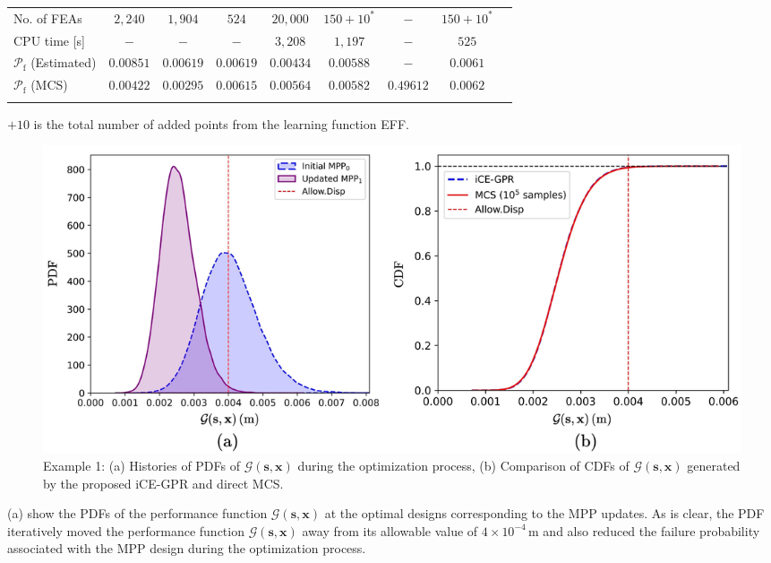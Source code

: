\documentclass[preprint,3p]{elsarticle}
\begin{document}
\begin{linenumbers}
\begin{table}
\begin{center}
{\begin{threeparttable}
\begin{tabular}{lcccccccc}
                    No. of FEAs & $2,240$&   $1,904$&    $524$&  $20,000$&   $150+10^*$&    $-$&    $150+10^*$\\
                    CPU time [s] & $-$& $-$&    $-$&    $3,208$&    $1,197$&    $-$&     $525$\\
                    $\mathcal{P}_\text{f}$ (Estimated)&  $0.00851$&   $0.00619$&  $0.00619$&  $0.00434$&  $0.00588$&    $-$&  $0.0061$\\
                    $\mathcal{P}_\text{f}$ (MCS)& $0.00422$&  $0.00295$&  $0.00615$&  $0.00564$&  $0.00582$& $0.49612$&   $0.0062$\\
                    \hline \noalign{\smallskip}
                \end{tabular}
                \begin{tablenotes}
                    \item * $+10$ is the total number of added points from the learning function EFF.
                \end{tablenotes}
        \end{threeparttable}}
    \end{center}
\end{table}

\begin{figure}[h!]
    \begin{center}
        \includegraphics[scale=1.185]{Fig6.jpg}
    \end{center}
    \caption{Example 1: (a) Histories of PDFs of $\mathcal{G}(\textbf{s},\textbf{x})$ during the optimization process, (b) Comparison of CDFs of $\mathcal{G}(\textbf{s},\textbf{x})$ generated by the proposed iCE-GPR and direct MCS.}
    \label{FIG:6}
\end{figure}

(a) show the PDFs of the performance function $\mathcal{G}(\textbf{s},\textbf{x})$ at the optimal designs corresponding to the MPP updates. As is clear, the PDF iteratively moved the performance function $\mathcal{G}(\textbf{s},\textbf{x})$ away from its allowable value of $4\times10^{-4}\,\text{m}$ and also reduced the failure probability associated with the MPP design during the optimization process.


\end{linenumbers}
\end{document}
